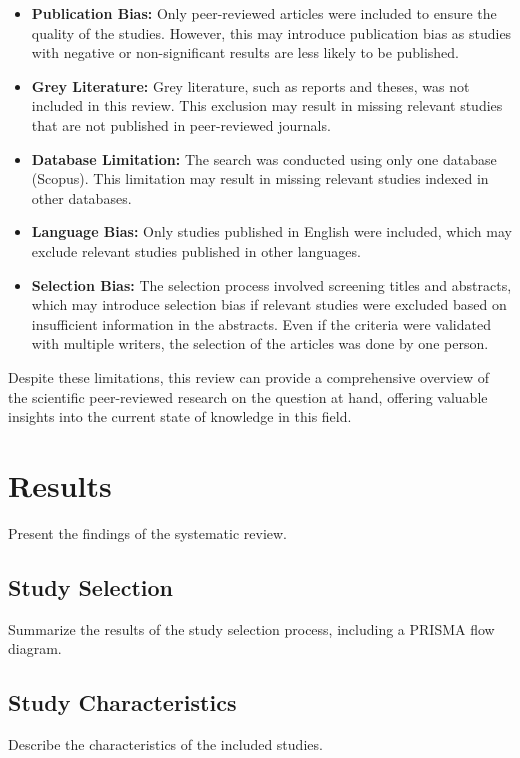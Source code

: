 \documentclass[a4paper,12pt]{article}
\begin{document}
\begin{itemize}
    \item \textbf{Publication Bias:} Only peer-reviewed articles were included to ensure the quality of the studies. However, this may introduce publication bias as studies with negative or non-significant results are less likely to be published.
    \item \textbf{Grey Literature:} Grey literature, such as reports and theses, was not included in this review. This exclusion may result in missing relevant studies that are not published in peer-reviewed journals.
    \item \textbf{Database Limitation:} The search was conducted using only one database (Scopus). This limitation may result in missing relevant studies indexed in other databases.
    \item \textbf{Language Bias:} Only studies published in English were included, which may exclude relevant studies published in other languages.
    \item \textbf{Selection Bias:} The selection process involved screening titles and abstracts, which may introduce selection bias if relevant studies were excluded based on insufficient information in the abstracts. Even if the criteria were validated with multiple writers, the selection of the articles was done by one person.
\end{itemize}

Despite these limitations, this review can provide a comprehensive overview of the scientific peer-reviewed research on the question at hand, offering valuable insights into the current state of knowledge in this field.

\section{Results}
\label{sec:results}
Present the findings of the systematic review.

\subsection{Study Selection}
Summarize the results of the study selection process, including a PRISMA flow diagram.

\subsection{Study Characteristics}
Describe the characteristics of the included studies.
\end{document}
